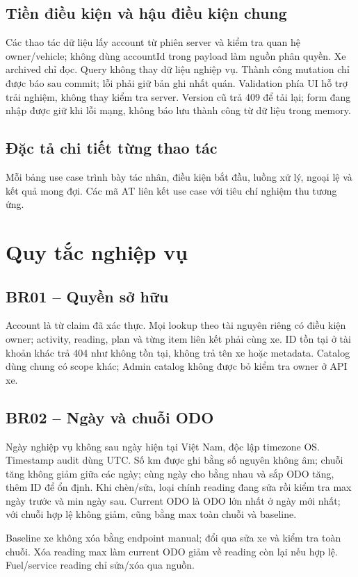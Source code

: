 \subsection{Tiền điều kiện và hậu điều kiện chung}
Các thao tác dữ liệu lấy account từ phiên server và kiểm tra quan hệ owner/vehicle; không dùng accountId trong payload làm nguồn phân quyền. Xe archived chỉ đọc. Query không thay dữ liệu nghiệp vụ. Thành công mutation chỉ được báo sau commit; lỗi phải giữ bản ghi nhất quán. Validation phía UI hỗ trợ trải nghiệm, không thay kiểm tra server. Version cũ trả 409 để tải lại; form đang nhập được giữ khi lỗi mạng, không báo lưu thành công từ dữ liệu trong memory.

\subsection{Đặc tả chi tiết từng thao tác}
Mỗi bảng use case trình bày tác nhân, điều kiện bắt đầu, luồng xử lý, ngoại lệ và kết quả mong đợi. Các mã AT liên kết use case với tiêu chí nghiệm thu tương ứng.


\section{Quy tắc nghiệp vụ}\label{sec:business-rules}
\subsection{BR01 -- Quyền sở hữu}
Account là từ claim đã xác thực. Mọi lookup theo tài nguyên riêng có điều kiện owner; activity, reading, plan và từng item liên kết phải cùng xe. ID tồn tại ở tài khoản khác trả 404 như không tồn tại, không trả tên xe hoặc metadata. Catalog dùng chung có scope khác; Admin catalog không được bỏ kiểm tra owner ở API xe.
\subsection{BR02 -- Ngày và chuỗi ODO}
Ngày nghiệp vụ không sau ngày hiện tại Việt Nam, độc lập timezone OS. Timestamp audit dùng UTC. Số km được ghi bằng số nguyên không âm; chuỗi tăng không giảm giữa các ngày; cùng ngày cho bằng nhau và sắp ODO tăng, thêm ID để ổn định. Khi chèn/sửa, loại chính reading đang sửa rồi kiểm tra max ngày trước và min ngày sau. Current ODO là ODO lớn nhất ở ngày mới nhất; với chuỗi hợp lệ không giảm, cũng bằng max toàn chuỗi và baseline.

Baseline xe không xóa bằng endpoint manual; đổi qua sửa xe và kiểm tra toàn chuỗi. Xóa reading max làm current ODO giảm về reading còn lại nếu hợp lệ. Fuel/service reading chỉ sửa/xóa qua nguồn.
